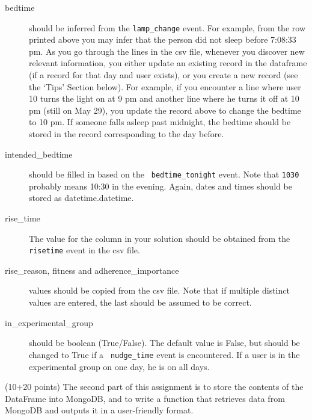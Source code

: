 \documentclass[a4paper]{report}
\theoremstyle{definition}
\begin{document}
\begin{description}

\item[bedtime] should be inferred from the \texttt{\small lamp\_change}
event. For example, from the row printed above you may infer that the
person did not sleep before 7:08:33 pm. As you go through the lines
in the csv file, whenever you discover new relevant information, you
either update an existing record in the dataframe (if a record for
that day and user exists), or you create a new record (see the `Tips'
Section below). For example, if you encounter a line where user 10 turns
the light on at 9 pm and another line where he turns it off at 10 pm
(still on May 29), you update the record above to change the bedtime
to 10 pm. If someone falls asleep past midnight, the bedtime should be
stored in the record corresponding to the day before.

\item[intended\_bedtime] should be filled in based on the \texttt{\small
bedtime\_tonight} event.  Note that \texttt{\small 1030} probably
means 10:30 in the evening. Again, dates and times should be stored
as datetime.datetime.

\item[rise\_time] The value for the column in your solution should be
obtained from the \texttt{\small risetime} event in the csv file.

\item[rise\_reason, fitness and adherence\_importance] values should
be copied from the csv file. Note that if multiple distinct values are
entered, the last should be assumed to be correct.

\item[in\_experimental\_group] should be boolean (True/False). The
default value is False, but should be changed to True if a \texttt{\small
nudge\_time} event is encountered.  If a user is in the experimental
group on one day, he is on all days.

\end{description}

(10+20 points) The second part of this assignment is to store the contents
of the DataFrame into MongoDB, and to write a function that retrieves
data from MongoDB and outputs it in a user-friendly format.
\end{document}
